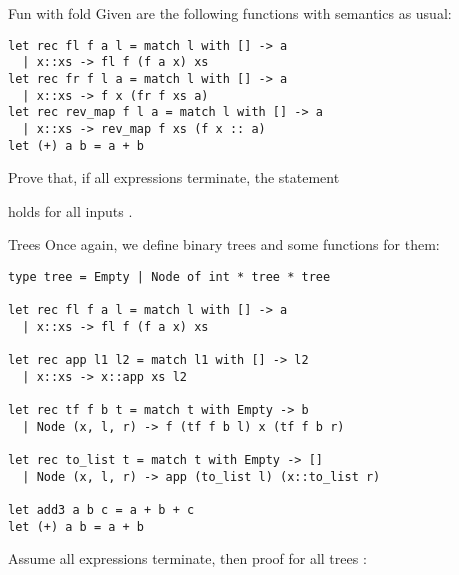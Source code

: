 \documentclass[
  english
]{tumteaching}
\begin{document}
\begin{assignment}[H,points=8]{Fun with fold}
  Given are the following functions with semantics as usual:
  \begin{verbatim}
let rec fl f a l = match l with [] -> a
  | x::xs -> fl f (f a x) xs
let rec fr f l a = match l with [] -> a
  | x::xs -> f x (fr f xs a)
let rec rev_map f l a = match l with [] -> a
  | x::xs -> rev_map f xs (f x :: a)
let (+) a b = a + b
  \end{verbatim}
  Prove that, if all expressions terminate, the statement
  \begin{center}
  \end{center}
  holds for all inputs .

\end{assignment}

\clearpage
\begin{assignment}[H,points=7]{Trees}
  Once again, we define binary trees and some functions for them:
  \begin{verbatim}
type tree = Empty | Node of int * tree * tree

let rec fl f a l = match l with [] -> a
  | x::xs -> fl f (f a x) xs

let rec app l1 l2 = match l1 with [] -> l2
  | x::xs -> x::app xs l2

let rec tf f b t = match t with Empty -> b
  | Node (x, l, r) -> f (tf f b l) x (tf f b r)

let rec to_list t = match t with Empty -> []
  | Node (x, l, r) -> app (to_list l) (x::to_list r)

let add3 a b c = a + b + c
let (+) a b = a + b
  \end{verbatim}
  Assume all expressions terminate, then proof for all trees :
  \begin{center}
  \end{center}

  \vspace*{5mm}\noindent{}

\end{assignment}
\end{document}
